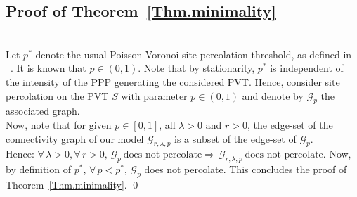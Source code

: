 \documentclass[10pt,a4paper]{amsart}
\theoremstyle{exampstyle}
\theoremstyle{exampnotations}
\begin{document}
\subsection{Proof of Theorem~\ref{Thm.minimality}}\mbox{}\\
\indent Let $p^*$ denote the usual Poisson-Voronoi site percolation threshold, as defined in ~\cite{becker_percolation_2009,neher2008topological}. It is known that $p \in \left(0,1\right)$. Note that by stationarity, $p^*$ is independent of the intensity of the PPP generating the considered PVT. Hence, consider site percolation on the PVT $S$ with parameter $p \in \left(0,1\right)$ and denote by $\mathcal{G}_p$ the associated graph. \\
Now, note that for given $p \in \left[0,1\right]$, all $\lambda >0$ and $r>0$, the edge-set of the connectivity graph of our model $\mathcal{G}_{r,\lambda,p}$ is a subset of the edge-set of $\mathcal{G}_p$. 
\\Hence: $\forall \, \lambda >0, \forall \, r>0, \, \mathcal{G}_{p} \ \text{does not percolate} \Rightarrow \, \mathcal{G}_{r, \lambda, p} \ \text{does not percolate}$.
Now, by definition of $p^*$, $\forall \, p < p^*, \, \mathcal{G}_p$ does not percolate. This concludes the proof of Theorem~\ref{Thm.minimality}. \qed
\\
\end{document}
